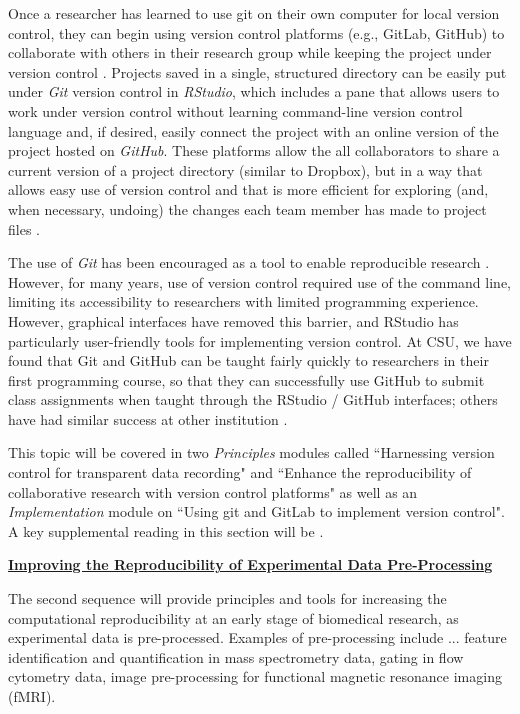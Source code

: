 \documentclass[pdftex,english,11pt,parskip=half]{scrartcl}
\begin{document}
Once a researcher has learned to use git on their own computer for local version control, they can begin using version control 
platforms (e.g., GitLab, GitHub) to collaborate with others in their research
group while keeping the project under version control \cite{bryan2018excuse, shade2015computing}. Projects saved in a single, structured directory
can be easily put under \textit{Git} version control in \textit{RStudio}, which
includes a pane that allows users to work under version control without learning
command-line version control language and, if desired, easily connect the
project with an online version of the project hosted on \textit{GitHub}. These platforms allow
the all collaborators to share a current version of a project directory 
(similar to Dropbox), but in a way that allows easy use of version control 
and that is more efficient for exploring (and, when necessary, undoing) the changes 
each team member has made to project files \cite{bryan2018excuse}. 

The use of \textit{Git} has been encouraged as a tool to enable reproducible research \cite{piccolo2016tools, ram2013git, bryan2018excuse, lowndes2017our, cetinkaya2017infrastructure}. However, for many years, use of version control required use of the command line,
limiting its accessibility to researchers with limited programming experience.
However, graphical interfaces have removed this barrier, and RStudio has 
particularly user-friendly tools for implementing version control. At CSU, we have found that Git and GitHub can be taught fairly quickly to researchers in their first programming course, so that they can successfully use GitHub to submit class assignments when taught through the RStudio / GitHub interfaces; others have had similar success at other institution \cite{bryan2018excuse}.

This
topic will be covered in two \textit{Principles} modules called ``Harnessing
version control for transparent data recording" and ``Enhance the
reproducibility of collaborative research with version control platforms" as
well as an \textit{Implementation} module on ``Using git and GitLab to implement
version control". A key supplemental reading in this section will be \cite{bryan2018excuse}.

\underline{\textbf{Improving the Reproducibility of Experimental Data
Pre-Processing}}

The second sequence will provide principles and tools for increasing the
computational reproducibility at an early stage of biomedical research, as
experimental data is pre-processed. Examples of pre-processing include ... feature identification and quantification in mass spectrometry data, gating in flow cytometry data, image pre-processing for functional magnetic resonance imaging (fMRI). 
\end{document}

